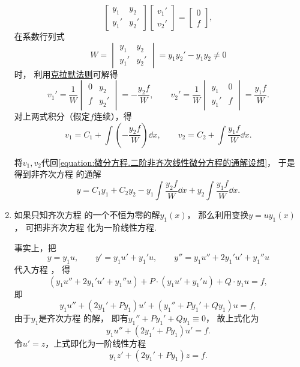 \begin{enumerate}
\[\begin{bmatrix}
			y_1 & y_2 \\
			y_1' & y_2'
		\end{bmatrix}
		\begin{bmatrix}
			v_1' \\ v_2'
		\end{bmatrix}
		= \begin{bmatrix}
			0 \\ f
		\end{bmatrix},
	\]
	在系数行列式\[
		W = \begin{vmatrix} y_1 & y_2 \\ y_1' & y_2' \end{vmatrix}
		= y_1 y_2' - y_1 y_2 \neq0
	\]时，
	利用\hyperref[theorem:线性方程组.克拉默法则]{克拉默法则}可解得\[
		v_1'
		= \frac1W \begin{vmatrix}
			0 & y_2 \\
			f & y_2'
		\end{vmatrix}
		= -\frac{y_2 f}{W},
		\qquad
		v_2'
		= \frac1W \begin{vmatrix}
			y_1 & 0 \\
			y_1' & f
		\end{vmatrix}
		= \frac{y_1 f}{W}.
	\]
	对上两式积分（假定\(f\)连续），得\[
		v_1 = C_1 + \int \left(-\frac{y_2 f}{W}\right) \dd{x},
		\qquad
		v_2 = C_2 + \int \frac{y_1 f}{W} \dd{x}.
	\]

	将\(v_1,v_2\)代回\cref{equation:微分方程.二阶非齐次线性微分方程的通解设想}，
	于是得到非齐次方程  的通解
	\begin{equation}\label{equation:微分方程.二阶非齐次线性微分方程的通解.形式1}
		y = C_1 y_1 + C_2 y_2
		- y_1 \int \frac{y_2 f}{W} \dd{x}
		+ y_2 \int \frac{y_1 f}{W} \dd{x}.
	\end{equation}

	\item%
	如果只知齐次方程 
	的一个不恒为零的解\(y_1(x)\)，
	那么利用变换\(y = u y_1(x)\)，
	可把非齐次方程 
	化为一阶线性方程.

	事实上，把\[
		y = y_1 u, \qquad y' = y_1 u' + y_1' u, \qquad y'' = y_1 u'' + 2 y_1' u' + y_1'' u
	\]
	代入方程 ，
	得\[
		(y_1 u'' + 2y_1' u' + y_1'' u) + P\cdot(y_1 u' + y_1' u) + Q \cdot y_1 u = f,
	\]
	即\[
		y_1 u'' + (2y_1' + P y_1) u' + (y_1'' + P y_1' + Q y_1) u = f,
	\]
	由于\(y_1\)是齐次方程  的解，
	即有\(y_1'' + P y_1' + Q y_1 \equiv 0\)，
	故上式化为\[
		y_1 u'' + (2 y_1' + P y_1) u' = f.
	\]
	令\(u' = z\)，上式即化为一阶线性方程
	\begin{equation}\label{equation:微分方程.降为一阶的二阶线性微分方程}
		y_1 z' + (2 y_1' + P y_1) z = f.
	\end{equation}


\end{enumerate}
